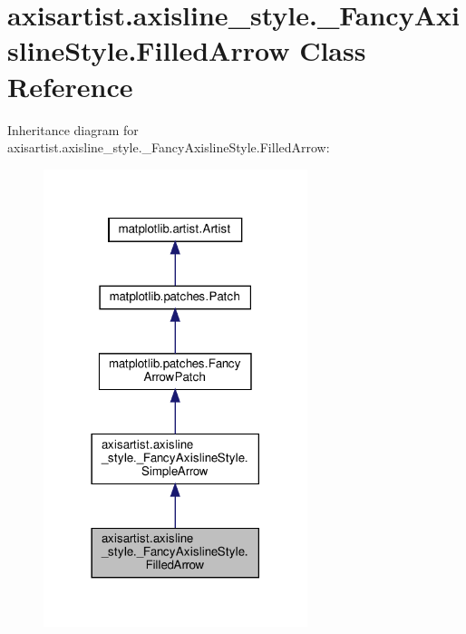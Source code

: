 \hypertarget{classaxisartist_1_1axisline__style_1_1__FancyAxislineStyle_1_1FilledArrow}{}\section{axisartist.\+axisline\+\_\+style.\+\_\+\+Fancy\+Axisline\+Style.\+Filled\+Arrow Class Reference}
\label{classaxisartist_1_1axisline__style_1_1__FancyAxislineStyle_1_1FilledArrow}


Inheritance diagram for axisartist.\+axisline\+\_\+style.\+\_\+\+Fancy\+Axisline\+Style.\+Filled\+Arrow\+:
\nopagebreak
\begin{figure}[H]
\begin{center}
\leavevmode
\includegraphics[width=218pt]{classaxisartist_1_1axisline__style_1_1__FancyAxislineStyle_1_1FilledArrow__inherit__graph}
\end{center}
\end{figure}


